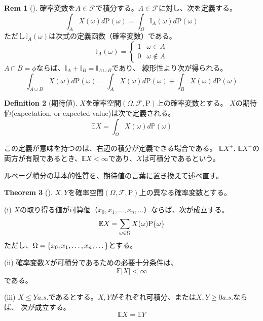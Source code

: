 \documentclass{ltjsarticle}
\numberwithin{equation}{subsection}
\theoremstyle{definition}
\newtheorem{dfn}{Definition}[subsection]
\newtheorem{thm}[dfn]{Theorem}
\newtheorem{rem}[dfn]{Rem}
\begin{document}
\begin{rem}[]
    確率変数を$A \in \mathcal{F}$で積分する。$A \in \mathcal{F}$に対し、次を定義する。
    \begin{equation}
        \int_{A} X(\omega) d\mathrm{P} (\omega) = \int_{\Omega} \mathbb{I}_A(\omega) d\mathrm{P} (\omega)
    \end{equation}
    ただし$\mathbb{I}_A(\omega)$は次式の定義函数（確率変数）である。
    \begin{equation}
        \mathbb{I}_A(\omega) =
        \begin{cases}
            1 & \omega \in A \\
            0 & \omega \notin A 
        \end{cases}
    \end{equation}
    $A \cap B = \phi$ならば、$\mathbb{I}_A + \mathbb{I}_B = \mathbb{I}_{A\cup B}$であり、
    線形性より次が得られる。
    \begin{equation}
        \int_{A\cup B} X(\omega) d\mathrm{P}(\omega) = \int_{A} X(\omega) d\mathrm{P} (\omega) + \int_{B} X(\omega) d\mathrm{P} (\omega)
    \end{equation}
\end{rem}


\begin{dfn}[期待値]
    $X$を確率空間$(\Omega , \mathcal{F} , \mathrm{P})$上の確率変数とする。
    $X$の期待値(expectation, or expected value)は次で定義される。
    \begin{equation}
        \mathbb{E}X = \int_{\Omega} X(\omega) d\mathbb{P} (\omega)
    \end{equation}
\end{dfn}
この定義が意味を持つのは、右辺の積分が定義できる場合である。
$\mathbb{E}X^+$, $\mathbb{E}X^-$の両方が有限であるとき、$\mathbb{E}X < \infty$であり、$X$は可積分であるという。


ルベーグ積分の基本的性質を、期待値の言葉に置き換えて述べ直す。
\begin{thm}[]
    $X,Y$を確率空間$(\Omega , \mathcal{F} , \mathrm{P})$上の異なる確率変数とする。


    (i) $X$の取り得る値が可算個（$x_0, x_1, \dots, x_n, \dots$）ならば、次が成立する。
    \begin{equation}
        \mathbb{E}X = \sum_{\omega \in \Omega} X(\omega) \mathrm{P} \qty{\omega}
    \end{equation}
    ただし、$\Omega = \qty{x_0, x_1, \dots, x_n, \dots}$とする。


    (ii) 確率変数$X$が可積分であるための必要十分条件は、
    \begin{equation}
        \mathbb{E} |X| < \infty
    \end{equation}
    である。


    (iii) $X \leq Y a.s.$であるとする。$X, Y$がそれぞれ可積分、または$X, Y \geq 0 a.s.$ならば、
    次が成立する。
    \begin{equation}
        \mathbb{E} X = \mathbb{E} Y
    \end{equation}
\end{thm}


% 
% 
\end{document}
